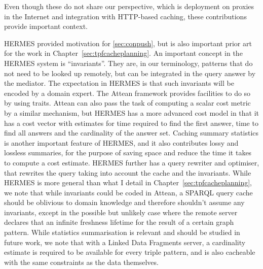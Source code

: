 Even though these do not share our perspective, which is deployment on
proxies in the Internet and integration with HTTP-based caching, these
contributions provide important context. 

HERMES \cite{adali1996query} provided motivation for
\ref{sec:conpush}, but is also important prior art for the work in
Chapter~\ref{sec:tpfcacheplanning}. An important concept in the HERMES
system is ``invariants''. They are, in our terminology, patterns that
do not need to be looked up remotely, but can be integrated in the
query answer by the mediator. The expectation in HERMES is that such
invariants will be encoded by a domain expert. The Attean framework
provides facilities to do so by using traits. Attean can also pass the
task of computing a scalar cost metric by a similar mechanism, but
HERMES has a more advanced cost model in that it has a cost vector
with estimates for time required to find the first answer, time to
find all answers and the cardinality of the answer set. Caching
summary statistics is another important feature of HERMES, and it also
contributes lossy and lossless summaries, for the purpose of saving
space and reduce the time it takes to compute a cost estimate. HERMES
further has a query rewriter and optimiser, that rewrites the query
taking into account the cache and the invariants. While HERMES is more
general than what I detail in Chapter~\ref{sec:tpfcacheplanning}, we
note that while invariants could be coded in Attean, a SPARQL query
cache should be oblivious to domain knowledge and therefore shouldn't
assume any invariants, except in the possible but unlikely case where
the remote server declares that an infinite freshness lifetime for the
result of a certain graph pattern. While statistics summarisation is
relevant and should be studied in future work, we note that with a
Linked Data Fragments server, a cardinality estimate is required to be
available for every triple pattern, and is also cacheable with the
same constraints as the data themselves.

